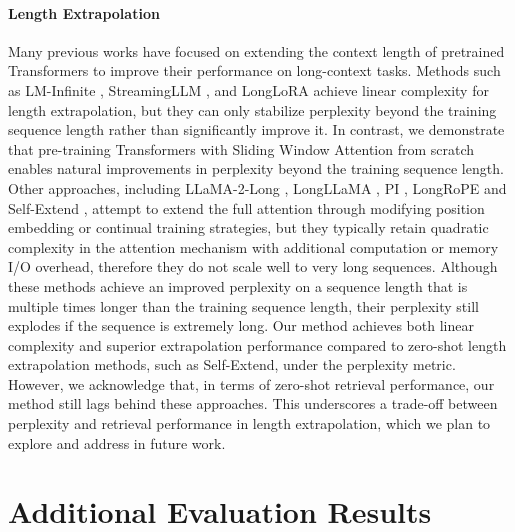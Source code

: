\documentclass{article}
\begin{document}
\paragraph{Length Extrapolation} 
 Many previous works have focused on extending the context length of pretrained Transformers to improve their performance on long-context tasks. Methods such as LM-Infinite \citep{han2023lminfinite}, StreamingLLM \citep{streamllm}, and LongLoRA \citep{chen2023longlora} achieve linear complexity for length extrapolation, but they can only stabilize perplexity beyond the training sequence length rather than significantly improve it. In contrast, we demonstrate that pre-training Transformers with Sliding Window Attention from scratch enables natural improvements in perplexity beyond the training sequence length. Other approaches, including LLaMA-2-Long \citep{xiong2023effective}, LongLLaMA \citep{tworkowski2023focused}, PI \citep{chen2023extending}, LongRoPE \citep{ding2024longrope} and Self-Extend \citep{jin2024llm}, attempt to extend the full attention through modifying position embedding or continual training strategies, but they typically retain quadratic complexity in the attention mechanism with additional computation or memory I/O overhead, therefore they do not scale well to very long sequences. Although these methods achieve an improved perplexity on a sequence length that is multiple times longer than the training sequence length, their perplexity still explodes if the sequence is extremely long. Our method achieves both linear complexity and superior extrapolation performance compared to zero-shot length extrapolation methods, such as Self-Extend, under the perplexity metric. However, we acknowledge that, in terms of zero-shot retrieval performance, our method still lags behind these approaches. This underscores a trade-off between perplexity and retrieval performance in length extrapolation, which we plan to explore and address in future work. 


\section{Additional Evaluation Results} \label{add_res}
\end{document}
